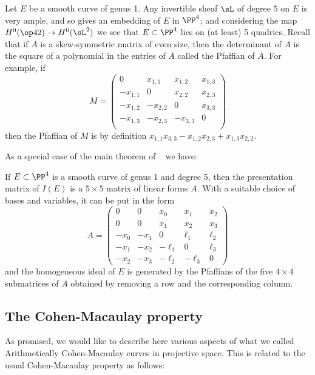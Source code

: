 \begin{fact}
Let $E$ be a smooth curve of genus 1. Any invertible sheaf $\sL$ of degree $5$ on $E$ is very ample, and so gives an embedding of $E$ in $\PP^4$; and considering the map $H^0(\op42) \to H^0(\sL^2)$
we see that $E\subset \PP^4$ lies on (at least) 5 quadrics. 
Recall that if $A$ is a skew-symmetric matrix of even size,
then the determinant of $A$ is the square of a polynomial in the entries of $A$ called the Pfaffian of $A$. For example, if
$$
M = \begin{pmatrix}
0&x_{1,1}&x_{1,2}&x_{1,3}\\
-x_{1,1}&0&x_{2,2}&x_{2,3}\\
-x_{1,2}&-x_{2,2}&0&x_{3,3}\\
-x_{1,3}&-x_{2,3}&-x_{3,3}&0\\
\end{pmatrix}
$$
then the Pfaffian of $M$ is by definition $x_{1,1}x_{3,3}-x_{1,2}x_{2,3}+x_{1,3}x_{2,2}$.

As a special case of the main theorem of ~\cite{MR453723} we have:
\begin{proposition} \cite[Theorem11]{Eisenbud1995}
If $E\subset \PP^4$ is a smooth curve of genus 1 and degree 5, then the presentation matrix of $I(E)$ is
a $5\times 5$ matrix of linear forms $A$. With a suitable choice of bases and variables, it can be put in the form
$$
A = 
\begin{pmatrix}
0&0&x_0&x_1&x_2\\
0&0&x_1&x_2&x_3\\
-x_0&-x_1&0&\ell_1&\ell_2\\
-x_1&-x_2&-\ell_1&0&\ell_3\\
-x_2&-x_3&-\ell_2&-\ell_3&0
\end{pmatrix}
$$
and
the homogeneous ideal of $E$ is generated by the  Pfaffians of the five $4\times 4$ submatrices of $A$ obtained by removing
a row and the corresponding column.
\end{proposition}
\end{fact}

\subsection{The Cohen-Macaulay property}\label{ACM}

As promised, we would like to describe here various aspects of what we called Arithmetically Cohen-Macaulay curves in projective space. This is related to the usual  Cohen-Macaulay property as follows:

